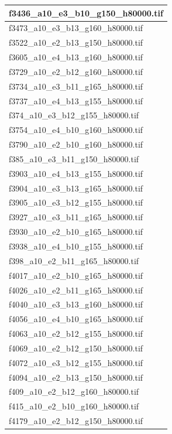 \documentclass[12pt, twoside]{article}
\begin{document}
\begin{appendices}
\begin{longtable}{|l|}
		f3436\_a10\_e3\_b10\_g150\_h80000.tif \\ \hline 
		f3473\_a10\_e3\_b13\_g160\_h80000.tif \\ \hline 
		f3522\_a10\_e2\_b13\_g150\_h80000.tif \\ \hline 
		f3605\_a10\_e4\_b13\_g160\_h80000.tif \\ \hline 
		f3729\_a10\_e2\_b12\_g160\_h80000.tif \\ \hline 
		f3734\_a10\_e3\_b11\_g165\_h80000.tif \\ \hline 
		f3737\_a10\_e4\_b13\_g155\_h80000.tif \\ \hline 
		f374\_a10\_e3\_b12\_g155\_h80000.tif \\ \hline 
		f3754\_a10\_e4\_b10\_g160\_h80000.tif \\ \hline 
		f3790\_a10\_e2\_b10\_g160\_h80000.tif \\ \hline 
		f385\_a10\_e3\_b11\_g150\_h80000.tif \\ \hline 
		f3903\_a10\_e4\_b13\_g155\_h80000.tif \\ \hline 
		f3904\_a10\_e3\_b13\_g165\_h80000.tif \\ \hline 
		f3905\_a10\_e3\_b12\_g155\_h80000.tif \\ \hline 
		f3927\_a10\_e3\_b11\_g165\_h80000.tif \\ \hline 
		f3930\_a10\_e2\_b10\_g165\_h80000.tif \\ \hline 
		f3938\_a10\_e4\_b10\_g155\_h80000.tif \\ \hline 
		f398\_a10\_e2\_b11\_g165\_h80000.tif \\ \hline 
		f4017\_a10\_e2\_b10\_g165\_h80000.tif \\ \hline 
		f4026\_a10\_e2\_b11\_g165\_h80000.tif \\ \hline 
		f4040\_a10\_e3\_b13\_g160\_h80000.tif \\ \hline 
		f4056\_a10\_e4\_b10\_g165\_h80000.tif \\ \hline 
		f4063\_a10\_e2\_b12\_g155\_h80000.tif \\ \hline 
		f4069\_a10\_e2\_b12\_g150\_h80000.tif \\ \hline 
		f4072\_a10\_e3\_b12\_g155\_h80000.tif \\ \hline 
		f4094\_a10\_e2\_b13\_g150\_h80000.tif \\ \hline 
		f409\_a10\_e2\_b12\_g160\_h80000.tif \\ \hline 
		f415\_a10\_e2\_b10\_g160\_h80000.tif \\ \hline 
		f4179\_a10\_e2\_b12\_g150\_h80000.tif \\ \hline 

\end{longtable}
\end{appendices}
\end{document}
